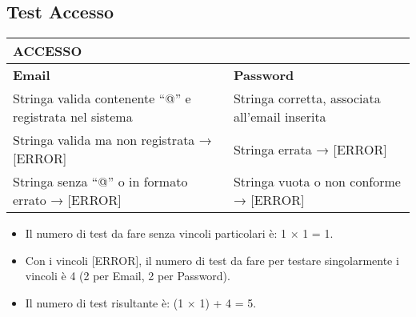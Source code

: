 \subsection{Test Accesso}
\label{sec:test_accesso}

\begin{tabular}{|p{6cm}|p{6cm}|}
\hline
\rowcolor{SkyBlue}
\textbf{ACCESSO	} & \\
\hline
\rowcolor{Red}
\textbf{Email} & \textbf{Password} \\ 
\hline
Stringa valida contenente “@” e registrata nel sistema & Stringa corretta, associata all’email inserita  \\
\hline
Stringa valida ma non registrata → [ERROR] &   Stringa errata → [ERROR] \\
\hline
Stringa senza “@” o in formato errato → [ERROR] &  Stringa vuota o non conforme → [ERROR] \\
\hline
\end{tabular}

\begin{itemize}
\item Il numero di test da fare senza vincoli particolari è: 1 × 1 = 1.
\item Con i vincoli [ERROR], il numero di test da fare per testare singolarmente i vincoli è 4 (2 per Email, 2 per Password). 
\item Il numero di test risultante è: (1 × 1) + 4 = 5.
\end{itemize}

